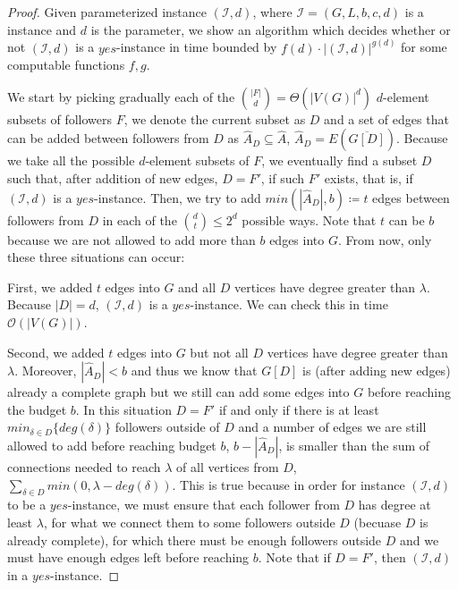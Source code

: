\begin{proof}\label{proof:XPd}
    Given parameterized instance $(\mathcal{I}, d)$, where $\mathcal{I} = (G, L, b, c, d)$ is a \HLdeg instance and $d$ is the parameter,
    we show an algorithm which decides whether or not $(\mathcal{I}, d)$ is a $yes$-instance in time bounded by
    $f(d) \cdot |(\mathcal{I}, d)|^{g(d)}$ for some computable functions $f,g$.

    We start by picking gradually each of the $\binom{|F|}{d} = \Theta(|V(G)|^d)$ $d$-element subsets of followers $F$,
    we denote the current subset as $D$ and a set of edges that can be added between followers from $D$
    as $\hat{A}_D \subseteq \hat{A}$, $\hat{A}_D = E(\overline{G[D]})$.
    Because we take all the possible $d$-element subsets of $F$, we eventually find a subset $D$ such that,
    after addition of new edges, $D = F'$,
    if such $F'$ exists, that is, if $(\mathcal{I}, d)$ is a $yes$-instance.
    Then, we try to add $min(|\hat{A}_D|, b) \coloneqq t$ edges between followers from $D$ in each of the $\binom{d}{t} \leq 2^d$ possible ways.
    Note that $t$ can be $b$ because we are not allowed to add more than $b$ edges into $G$.
    From now, only these three situations can occur:

    First, we added $t$ edges into $G$ and all $D$ vertices have degree greater than $\lambda$.
    Because $|D| = d$, $(\mathcal{I}, d)$ is a $yes$-instance.
    We can check this in time $\mathcal{O}(|V(G)|)$.
    
    Second, we added $t$ edges into $G$ but not all $D$ vertices have degree greater than $\lambda$.
    Moreover, $|\hat{A}_D| < b$ and thus we know that $G[D]$ is (after adding new edges) already a complete graph
    but we still can add some edges into $G$ before reaching the budget $b$. 
    In this situation $D = F'$ if and only if there is at least $min_{\delta \in D}\{deg(\delta)\}$ followers
    outside of $D$ and a number of edges we are still allowed to add before reaching budget $b$, $b - |\hat{A}_D|$,
    is smaller than the sum of connections needed to reach $\lambda$ of all vertices from $D$,
    $\sum_{\delta \in D} min(0, \lambda - deg(\delta))$.
    This is true because in order for instance $(\mathcal{I}, d)$ to be a $yes$-instance, we must
    ensure that each follower from $D$ has degree at least $\lambda$, for what we connect them to some followers
    outside $D$ (becuase $D$ is already complete), for which there must be enough followers outside $D$ and
    we must have enough edges left before reaching $b$.
    Note that if $D = F'$, then $(\mathcal{I}, d)$ in a $yes$-instance.
    

\end{proof}
